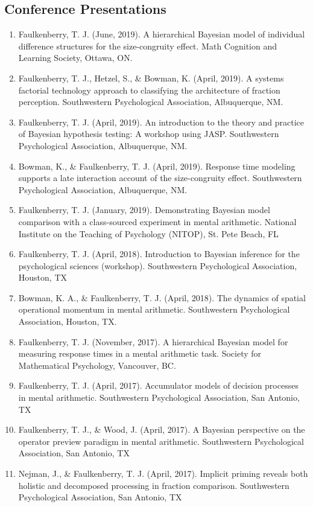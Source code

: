 \documentclass[article,10pt]{article}
\begin{document}
\subsection*{Conference Presentations}
\label{sec:org03c5c33}
\begin{enumerate}
\item Faulkenberry, T. J. (June, 2019). A hierarchical Bayesian model of individual difference structures for the size-congruity effect. Math Cognition and Learning Society, Ottawa, ON.
\item Faulkenberry, T. J., Hetzel, S., \& Bowman, K. (April, 2019). A systems factorial technology approach to classifying the architecture of fraction perception. Southwestern Psychological Association, Albuquerque, NM.
\item Faulkenberry, T. J. (April, 2019). An introduction to the theory and practice of Bayesian hypothesis testing: A workshop using JASP. Southwestern Psychological Association, Albuquerque, NM.
\item Bowman, K., \& Faulkenberry, T. J. (April, 2019). Response time modeling supports a late interaction account of the size-congruity effect. Southwestern Psychological Association, Albuquerque, NM.
\item Faulkenberry, T. J. (January, 2019). Demonstrating Bayesian model comparison with a class-sourced experiment in mental arithmetic. National Institute on the Teaching of Psychology (NITOP), St. Pete Beach, FL
\item Faulkenberry, T. J. (April, 2018). Introduction to Bayesian inference for the psychological sciences (workshop). Southwestern Psychological Association, Houston, TX
\item Bowman, K. A., \& Faulkenberry, T. J. (April, 2018). The dynamics of spatial operational momentum in mental arithmetic. Southwestern Psychological Association, Houston, TX.
\item Faulkenberry, T. J. (November, 2017). A hierarchical Bayesian model for measuring response times in a mental arithmetic task. Society for Mathematical Psychology, Vancouver, BC.
\item Faulkenberry, T. J. (April, 2017). Accumulator models of decision processes in mental arithmetic. Southwestern Psychological Association, San Antonio, TX
\item Faulkenberry, T. J., \& Wood, J. (April, 2017). A Bayesian perspective on the operator preview paradigm in mental arithmetic. Southwestern Psychological Association, San Antonio, TX
\item Nejman, J., \& Faulkenberry, T. J. (April, 2017). Implicit priming reveals both holistic and decomposed processing in fraction comparison. Southwestern Psychological Association, San Antonio, TX

\end{enumerate}
\end{document}
